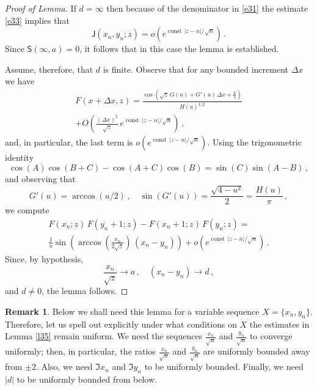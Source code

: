 \documentclass[12pt]{amsart}
\newcommand{\J}{\mathsf{J}}
\newcommand{\const}{\operatorname{const}}
\newcommand{\bS}{\mathsf{S}}
\newcommand{\De}{\Delta}
\theoremstyle{plain}
\theoremstyle{definition}
\newtheorem{remark}[lemma]{Remark}
\numberwithin{equation}{section}
\begin{document}
\begin{proof}[Proof of Lemma]
 If $d=\infty$ then 
because of the denominator in \eqref{e31} the estimate \eqref{e33} implies that 
%
\begin{equation*}
\J(x_n,y_n;z)=o\left(e^{\const\, |z-n|/\sqrt{n}}\right)\,.
\end{equation*}
%
Since $\bS(\infty,a)=0$, it follows that  in this case the 
lemma is established. 

Assume, therefore, that $d$ is finite. 
Observe that for any bounded increment $\De x$ we  have
%
\begin{multline}\label{e34}
F(x+\De x,z)=\frac{\cos
\left(\sqrt{z} \, G(u) +G'(u)\,\De x+ \frac{\pi}4\right)}
{H(u)^{1/2}}\\
 +O\left( \frac{(\De x)^2}{\sqrt z}\, e^{\const\, |z-n|/\sqrt{n}}\right)\,,
\end{multline}
%
and, in particular, the last term is $o\left(e^{\const\, |z-n|/\sqrt{n}}\right)$. 
Using the trigonometric identity 
%
\begin{equation*}
 \cos\left(A\right)\cos\left(B+C\right)-\cos\left(A+C\right)\cos\left(B\right)=
\sin\left(C\right)\sin\left(A-B\right)\,,  
\end{equation*}
%
and observing that
%
\begin{equation*}
G'(u)=\arccos(u/2) \,, 
\quad \sin(G'(u))=\frac{\sqrt{4-u^2}}2=\frac{H(u)}{\pi}\,,
\end{equation*}
%
we compute 
%
\begin{multline*}
F(x_n;z)\, F(y_n+1;z) -F(x_n+1;z) \,F(y_n;z) = \\
\frac1{\pi} \sin\left(\arccos\left(\frac{x_n}{2\sqrt{z}}\right)\, (x_n-y_n)\right) + 
 o\left(e^{\const\, |z-n|/\sqrt{n}}\right)\,.
\end{multline*} 
%
Since, by  hypothesis,
%
\begin{equation*}
\frac{x_n}{\sqrt{z}} \to a\,, \quad  (x_n-y_n) \to d \,, 
\end{equation*}
%
and $d\ne 0$, the lemma follows. \end{proof}
 
\begin{remark}
Below  we shall need this lemma for a variable  sequence $X=\{x_n,y_n\}$.
Therefore, let us spell out explicitly under what conditions on $X$  the
estimates in Lemma \ref{l35} remain uniform. We need the sequences
$\frac{x_n}{\sqrt{n}}$ and $\frac{y_n}{\sqrt{n}}$ to converge uniformly; then, in particular,
the ratios $\frac{x_n}{\sqrt{n}}$ and $\frac{y_n}{\sqrt{n}}$ are uniformly bounded
away from $\pm 2$.  Also, we need $\Im x_n$ and $\Im y_n$ to be
uniformly bounded. Finally, we need $|d|$ to be uniformly bounded from below.
\end{remark} 
\end{document}
